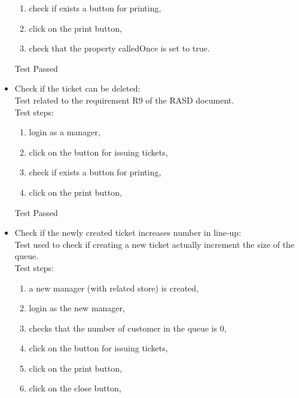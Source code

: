 \begin{itemize}
\begin{enumerate}
        \item check if exists a button for printing,

        \item click on the print button,

        \item check that the property calledOnce is set to true.
    \end{enumerate}
    Test Passed \\

    \item Check if the ticket can be deleted: \\
    Test related to the requirement R9 of the RASD document. \\
    Test steps: \\
    \begin{enumerate}
        \item login as a manager,

        \item click on the button for issuing tickets,

        \item check if exists a button for printing,

        \item click on the print button,
    \end{enumerate}
    Test Passed\\

    \item Check if the newly created ticket increases number in line-up: \\
    Test used to check if creating a new ticket actually increment the size of the queue. \\
    Test steps: \\
    \begin{enumerate}
        \item a new manager (with related store) is created,

        \item login as the new manager,

        \item checks that the number of customer in the queue is 0,

        \item click on the button for issuing tickets,

        \item click on the print button,

        \item click on the close button,


\end{enumerate}
\end{itemize}
